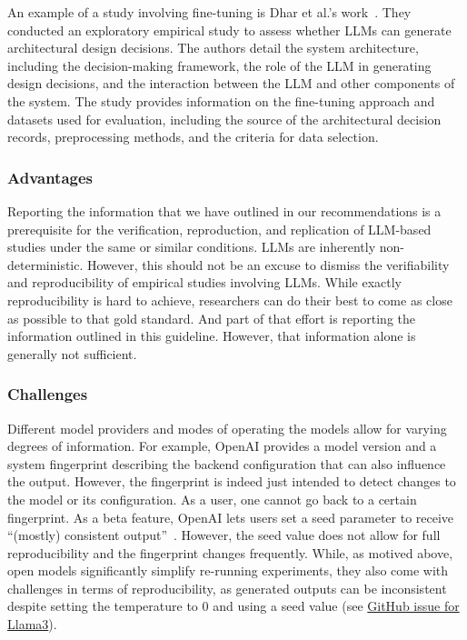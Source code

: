 An example of a study involving fine-tuning is Dhar et al.'s work~\cite{DBLP:conf/icsa/DharVV24}.
They conducted an exploratory empirical study to assess whether LLMs can generate architectural design decisions. The authors detail the system architecture, including the decision-making framework, the role of the LLM in generating design decisions, and the interaction between the LLM and other components of the system. The study provides information on the fine-tuning approach and datasets used for evaluation, including the source of the architectural decision records, preprocessing methods, and the criteria for data selection. 


\subsubsection{Advantages}

Reporting the information that we have outlined in our recommendations is a prerequisite for the verification, reproduction, and replication of LLM-based studies under the same or similar conditions.
LLMs are inherently non-deterministic. 
However, this should not be an excuse to dismiss the verifiability and reproducibility of empirical studies involving LLMs.
While exactly reproducibility is hard to achieve, researchers can do their best to come as close as possible to that gold standard.
And part of that effort is reporting the information outlined in this guideline. 
However, that information alone is generally not sufficient.

\subsubsection{Challenges}

Different model providers and modes of operating the models allow for varying degrees of information.
For example, OpenAI provides a model version and a system fingerprint describing the backend configuration that can also influence the output.
However, the fingerprint is indeed just intended to detect changes to the model or its configuration.
As a user, one cannot go back to a certain fingerprint.
As a beta feature, OpenAI lets users set a seed parameter to receive ``(mostly) consistent output''~\cite{OpenAI23}.
However, the seed value does not allow for full reproducibility and the fingerprint changes frequently. 
While, as motived above, open models significantly simplify re-running experiments, they also come with challenges in terms of reproducibility, as generated outputs can be inconsistent despite setting the temperature to 0 and using a seed value (see \href{https://github.com/ollama/ollama/issues/5321}{GitHub issue for Llama3}).


